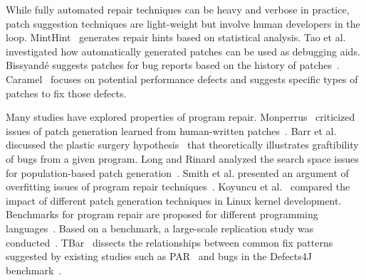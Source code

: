 While fully automated repair techniques can be heavy and verbose in practice, patch suggestion techniques are light-weight but involve human developers in the loop.
MintHint~\cite{kaleeswaran2014minthint} generates repair hints based on statistical analysis. Tao et al.~\cite{tao2014automatically} investigated how automatically generated patches can be used as debugging aids. 
Bissyand{\'e} suggests patches for bug reports based on the history of patches~\cite{bissyande2015harvesting}. 
Caramel~\cite{nistor2015caramel} focuses on potential performance defects and suggests specific types of patches to fix those defects. 

Many studies have explored properties of program repair. Monperrus~\cite{monperrus2014critical} criticized issues of patch generation learned from human-written patches~\cite{kim2013automatic}. Barr et al. discussed the plastic surgery hypothesis~\cite{barr2014plastic} that theoretically illustrates graftibility of bugs from a given program.
Long and Rinard analyzed the search space issues for population-based patch generation~\cite{long2016analysis}. Smith et al. presented an argument of overfitting issues of program repair techniques~\cite{smith2015cure}. Koyuncu et al.~\cite{koyuncu2017impact} compared the impact of different patch generation techniques in Linux kernel development.
Benchmarks for program repair are proposed for different programming languages~\cite{le2015manybugs, just2014defects4j}. Based on a benchmark, a large-scale replication study was conducted~\cite{martinez2017automatic}.
TBar~\cite{liu_tbar_2019} dissects the relationships between common fix patterns suggested by existing studies such as PAR~\cite{kim2013automatic} and bugs in the Defects4J benchmark~\cite{just2014defects4j}. 



